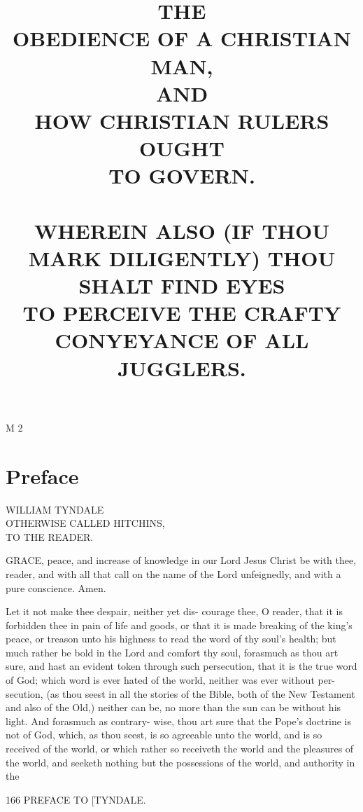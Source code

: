 \documentclass{custom}
\begin{document}
\title{THE\\
OBEDIENCE OF A CHRISTIAN MAN,\\
AND\\
HOW CHRISTIAN RULERS OUGHT\\
TO GOVERN.\\
\\
WHEREIN ALSO (IF THOU MARK DILIGENTLY) THOU SHALT FIND EYES\\
TO PERCEIVE THE CRAFTY CONYEYANCE OF ALL JUGGLERS.}
\author{}
\date{}
\maketitle



M 2 


\section*{Preface}
\begin{center}
WILLIAM TYNDALE\\
OTHERWISE CALLED HITCHINS,\\
TO THE READER. 
\end{center}

GRACE, peace, and increase of knowledge in 
our Lord Jesus Christ be with thee, reader, 
and with all that call on the name of the Lord 
unfeignedly, and with a pure conscience. Amen. 

Let it not make thee despair, neither yet dis- 
courage thee, O reader, that it is forbidden thee 
in pain of life and goods, or that it is made 
breaking of the king's peace, or treason unto his
highness to read the word of thy soul's health;
but much rather be bold in the Lord and comfort
thy soul, forasmuch as thou art sure, and hast an 
evident token through such persecution, that it is 
the true word of God; which word is ever hated 
of the world, neither was ever without per- 
secution, (as thou seest in all the stories of the 
Bible, both of the New Testament and also of the 
Old,) neither can be, no more than the sun can be
without his light. And forasmuch as contrary-
wise, thou art sure that the Pope's doctrine is
not of God, which, as thou seest, is so agreeable 
unto the world, and is so received of the world, 
or which rather so receiveth the world and the 
pleasures of the world, and seeketh nothing but 
the possessions of the world, and authority in the 


166 
PREFACE TO 
[TYNDALE.
\end{document}
